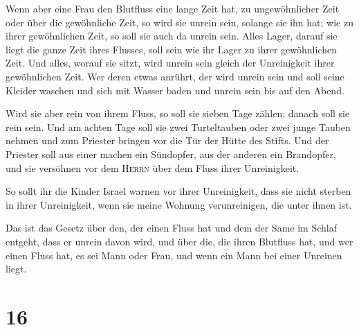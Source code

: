  Wenn aber eine Frau den Blutfluss eine lange Zeit hat,
zu ungewöhnlicher Zeit oder über die gewöhnliche Zeit, so wird sie
unrein sein, solange sie ihn hat; wie zu ihrer gewöhnlichen Zeit, so
soll sie auch da unrein sein.  Alles Lager, darauf sie
liegt die ganze Zeit ihres Flusses, soll sein wie ihr Lager zu ihrer
gewöhnlichen Zeit. Und alles, worauf sie sitzt, wird unrein sein gleich
der Unreinigkeit ihrer gewöhnlichen Zeit.  Wer deren
etwas anrührt, der wird unrein sein und soll seine Kleider waschen und
sich mit Wasser baden und unrein sein bis auf den Abend.

 Wird sie aber rein von ihrem Fluss, so soll sie sieben
Tage zählen; danach soll sie rein sein.  Und am achten
Tage soll sie zwei Turteltauben oder zwei junge Tauben nehmen und zum
Priester bringen vor die Tür der Hütte des Stifts.  Und
der Priester soll aus einer machen ein Sündopfer, aus der anderen ein
Brandopfer, und sie versöhnen vor dem \textsc{Herrn} über dem Fluss
ihrer Unreinigkeit.

 So sollt ihr die Kinder Israel warnen vor ihrer
Unreinigkeit, dass sie nicht sterben in ihrer Unreinigkeit, wenn sie
meine Wohnung verunreinigen, die unter ihnen ist.

 Das ist das Gesetz über den, der einen Fluss hat und dem
der Same im Schlaf entgeht, dass er unrein davon wird, 
und über die, die ihren Blutfluss hat, und wer einen Fluss hat, es sei
Mann oder Frau, und wenn ein Mann bei einer Unreinen liegt.

\hypertarget{section-15}{%
\section{16}\label{section-15}}

